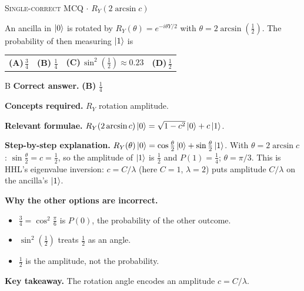 \documentclass[11pt,a4paper]{article}
\newcommand{\optlabel}[1]{\textbf{(#1)}}
\newcommand{\correctlabel}[1]{\textcolor{okgreen}{\textbf{(#1)}\,\ding{51}}}
\newenvironment{qitem}[1]{\begin{list}{}{\setlength{\leftmargin}{3.3em}\setlength{\labelwidth}{3.1em}%
  \setlength{\labelsep}{0.2em}\setlength{\topsep}{3pt}\setlength{\parsep}{3pt}}\item[\textbf{Q.#1}\hfill]}{\end{list}}
\newcommand{\qsep}{\par\vspace{2pt}{\color{black!15}\hrule}\vspace{4pt}}
\newcommand{\qmeta}[2]{{\footnotesize\color{black!60}\textsc{#1} \;$\cdot$\; #2}\par}
\begin{document}
\begin{qitem}{27}
\qmeta{Single-correct MCQ}{$R_Y(2\arcsin c)$}
An ancilla in $\ket0$ is rotated by $R_Y(\theta) = e^{-i\theta Y/2}$ with $\theta = 2\arcsin(\tfrac12)$. The probability of then measuring $\ket1$ is
\par\smallskip\noindent\begin{tabularx}{\linewidth}{@{}*{4}{L}@{}}
\optlabel{A}\,$\tfrac34$ & \correctlabel{B}\,$\tfrac14$ & \optlabel{C}\,$\sin^2(\tfrac12) \approx 0.23$ & \optlabel{D}\,$\tfrac12$
\end{tabularx}
\end{qitem}
\begin{solbox}{B}
\textbf{\color{brand}Correct answer.} \textcolor{okgreen}{\textbf{(B)}} $\tfrac14$

\textbf{\color{brand}Concepts required.} $R_Y$ rotation amplitude.

\textbf{\color{brand}Relevant formulae.} $R_Y(2\arcsin c)\ket0 = \sqrt{1 - c^2}\ket0 + c\ket1$.

\textbf{\color{brand}Step-by-step explanation.} $R_Y(\theta)\ket0 = \cos\frac\theta2\ket0 + \sin\frac\theta2\ket1$. With $\theta = 2\arcsin c$: $\sin\frac\theta2 = c = \tfrac12$, so the amplitude of $\ket1$ is $\tfrac12$ and $P(1) = \tfrac14$; $\theta = \pi/3$.
This is HHL's eigenvalue inversion: $c = C/\lambda$ (here $C = 1$, $\lambda = 2$) puts amplitude $C/\lambda$ on the ancilla's $\ket1$.

\textbf{\color{brand}Why the other options are incorrect.}
\begin{itemize}[leftmargin=2.4em, itemsep=1pt, topsep=2pt]
\item[\textbf{(A)}] $\frac34 = \cos^2\frac\pi6$ is $P(0)$, the probability of the other outcome.
\item[\textbf{(C)}] $\sin^2(\frac12)$ treats $\frac12$ as an angle.
\item[\textbf{(D)}] $\frac12$ is the amplitude, not the probability.
\end{itemize}
\textbf{\color{brand}Key takeaway.} The rotation angle encodes an amplitude $c = C/\lambda$.
\end{solbox}
\qsep
\end{document}
